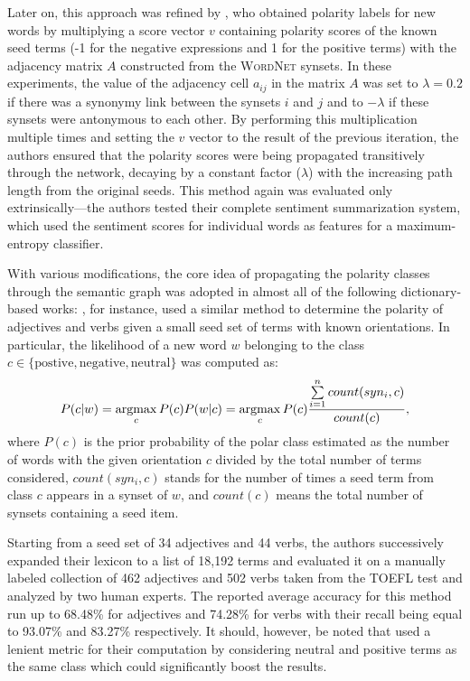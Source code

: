 Later on, this approach was refined by \citet{Blair-Goldensohn:08},
who obtained polarity labels for new words by multiplying a score
vector $v$ containing polarity scores of the known seed terms (-1 for
the negative expressions and 1 for the positive terms) with the
adjacency matrix $A$ constructed from the \textsc{WordNet} synsets.
In these experiments, the value of the adjacency cell $a_{ij}$ in the
matrix $A$ was set to $\lambda=0.2$ if there was a synonymy link
between the synsets $i$ and $j$ and to $-\lambda$ if these synsets
were antonymous to each other.  By performing this multiplication
multiple times and setting the $v$ vector to the result of the
previous iteration, the authors ensured that the polarity scores were
being propagated transitively through the network, decaying by a
constant factor ($\lambda$) with the increasing path length from the
original seeds.  This method again was evaluated only
extrinsically---the authors tested their complete sentiment
summarization system, which used the sentiment scores for individual
words as features for a maximum-entropy classifier.

With various modifications, the core idea of propagating the polarity
classes through the semantic graph was adopted in almost all of the
following dictionary-based works: \citet{Kim:04,Kim:06}, for instance,
used a similar method to determine the polarity of adjectives and
verbs given a small seed set of terms with known orientations.  In
particular, the likelihood of a new word $w$ belonging to the class $c
\in \{\textrm{postive}, \textrm{negative}, \textrm{neutral}\}$ was
computed as:
\begin{equation*}
  P(c|w) = \argmax_{c}P(c)P(w|c) = \argmax_{c}P(c)\frac{\sum\limits_{i=1}^{n}count(syn_i, c)}{count(c)},
\end{equation*}
where $P(c)$ is the prior probability of the polar class estimated as
the number of words with the given orientation $c$ divided by the
total number of terms considered, $count(syn_i, c)$ stands for the
number of times a seed term from class $c$ appears in a synset of $w$,
and $count(c)$ means the total number of synsets containing a seed
item.

Starting from a seed set of 34 adjectives and 44 verbs, the authors
successively expanded their lexicon to a list of 18,192 terms and
evaluated it on a manually labeled collection of 462 adjectives and
502 verbs taken from the TOEFL test and analyzed by two human experts.
The reported average accuracy for this method run up to 68.48\% for
adjectives and 74.28\% for verbs with their recall being equal to
93.07\% and 83.27\% respectively.  It should, however, be noted that
\citet{Kim:04} used a lenient metric for their computation by
considering neutral and positive terms as the same class which could
significantly boost the results.

